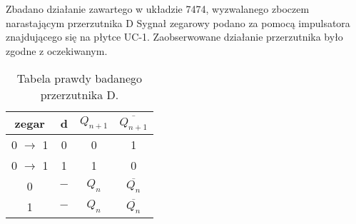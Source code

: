 \section{}
Zbadano działanie zawartego w układzie 7474, wyzwalanego zboczem narastającym przerzutnika D
Sygnał zegarowy podano za pomocą impulsatora znajdującego się na płytce UC-1.
Zaobserwowane działanie przerzutnika było zgodne z oczekiwanym.

\begin{table}[H]
    \centering
    \begin{tabular}{c|c||c|c}
        \hline
        zegar               & d     & \(Q_{n+1}\) & \(\overline{Q_{n+1}}\)
        \\ \hline\hline
        0 \(\rightarrow\) 1 & 0     & 0           & 1                      \\ \hline
        0 \(\rightarrow\) 1 & 1     & 1           & 0                      \\ \hline
        0                   & \(-\) & \(Q_n\)     & \(\overline{Q_n}\)     \\ \hline
        1                   & \(-\) & \(Q_n\)     & \(\overline{Q_n}\)     \\ \hline
    \end{tabular}
    \caption{Tabela prawdy badanego przerzutnika D.}
\end{table}